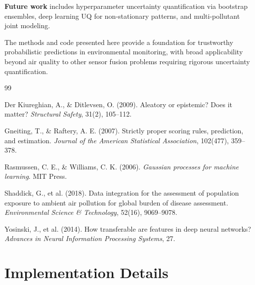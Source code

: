 \documentclass[11pt,letterpaper]{article}
\begin{document}
\textbf{Future work} includes hyperparameter uncertainty quantification via bootstrap ensembles, deep learning UQ for non-stationary patterns, and multi-pollutant joint modeling.

The methods and code presented here provide a foundation for trustworthy probabilistic predictions in environmental monitoring, with broad applicability beyond air quality to other sensor fusion problems requiring rigorous uncertainty quantification.



\begin{thebibliography}{99}

Der Kiureghian, A., \& Ditlevsen, O. (2009).
Aleatory or epistemic? Does it matter?
\textit{Structural Safety}, 31(2), 105--112.

Gneiting, T., \& Raftery, A. E. (2007).
Strictly proper scoring rules, prediction, and estimation.
\textit{Journal of the American Statistical Association}, 102(477), 359--378.

Rasmussen, C. E., \& Williams, C. K. (2006).
\textit{Gaussian processes for machine learning}.
MIT Press.

Shaddick, G., et al. (2018).
Data integration for the assessment of population exposure to ambient air pollution for global burden of disease assessment.
\textit{Environmental Science \& Technology}, 52(16), 9069--9078.

Yosinski, J., et al. (2014).
How transferable are features in deep neural networks?
\textit{Advances in Neural Information Processing Systems}, 27.


\end{thebibliography}


\appendix

\section{Implementation Details}
\end{document}
